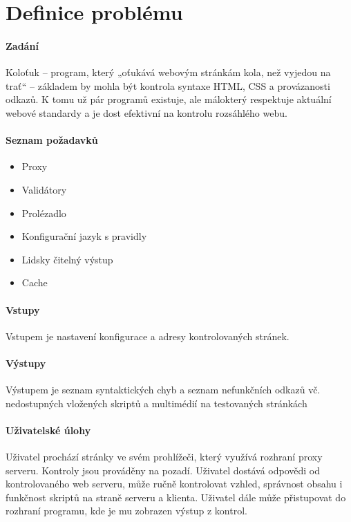\documentclass[10pt]{article}
\begin{document}
	\section{Definice probl\'emu}
	\paragraph{Zad\'an\'i}
	Koloťuk – program, který „oťukává webovým stránkám kola, než vyjedou na trať“ – základem by mohla být kontrola syntaxe HTML, CSS a provázanosti odkazů. K tomu už pár programů existuje, ale málokterý respektuje aktuální webové standardy a je dost efektivní na kontrolu rozsáhlého webu. 
	\paragraph{Seznam po\v{z}adavk\r{u}}
	\begin{itemize}
		\item Proxy
		\item Valid\'atory
		\item Prol\'ezadlo
		\item Konfigura\v{c}n\'i jazyk s pravidly
		\item Lidsky \v{c}iteln\'y v\'ystup
		\item Cache
	\end{itemize}
	\paragraph{Vstupy} Vstupem je nastaven\'i konfigurace a adresy kontrolovan\'ych str\'anek.
	\paragraph{V\'ystupy} V\'ystupem je seznam syntaktick\'ych chyb a seznam nefunk\v{c}n\'ich odkaz\r{u} v\v{c}. nedostupn\'ych vlo\v{z}en\'ych skript\r{u} a multim\'edi\'i na testovan\'ych str\'ank\'ach
	\paragraph{U\v{z}ivatelsk\'e \'ulohy} U\v{z}ivatel proch\'az\'i str\'anky ve sv\'em prohl\'i\v{z}e\v{c}i, kter\'y vyu\v{z}\'iv\'a rozhran\'i proxy serveru. Kontroly jsou prov\'ad\v{e}ny na pozad\'i. U\v{z}ivatel dost\'av\'a odpov\v{e}di od kontrolovan\'eho web serveru, m\r{u}\v{z}e ru\v{c}n\v{e} kontrolovat vzhled, spr\'avnost obsahu i funk\v{c}nost skript\r{u} na stran\v{e} serveru a klienta. U\v{z}ivatel d\'ale m\r{u}\v{z}e p\v{r}istupovat do rozhran\'i programu, kde je mu zobrazen v\'ystup z kontrol.
\end{document}
